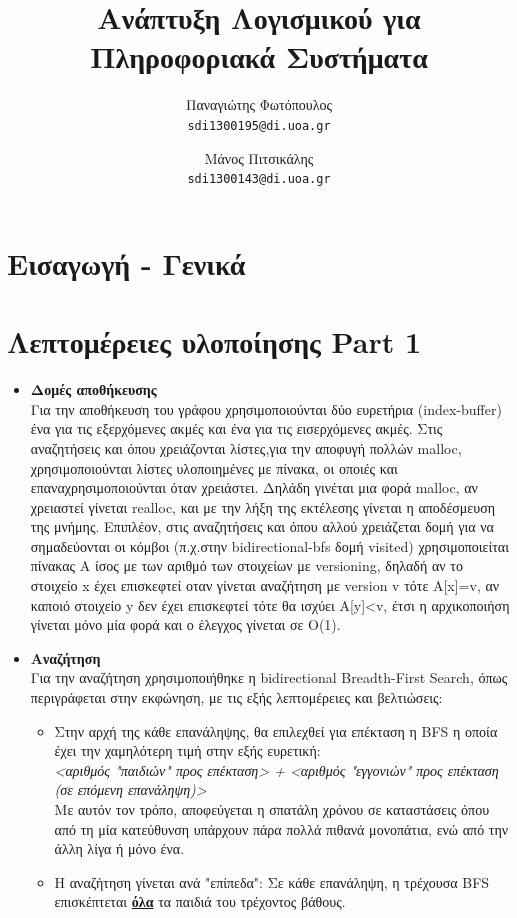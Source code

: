 \documentclass[11pt]{article}
\title{Ανάπτυξη Λογισμικού για Πληροφοριακά Συστήματα}
\author{Παναγιώτης Φωτόπουλος\\
  \texttt{sdi1300195@di.uoa.gr}
  \and Μάνος Πιτσικάλης\\
  \texttt{sdi1300143@di.uoa.gr}}
\date{}
\begin{document}
\maketitle


\section{Εισαγωγή - Γενικά}

\section{Λεπτομέρειες υλοποίησης Part 1}
\begin{itemize}
\item \textbf{Δομές αποθήκευσης}\\ Για την αποθήκευση του γράφου χρησιμοποιούνται δύο ευρετήρια (index-buffer) ένα για τις εξερχόμενες ακμές και ένα για τις εισερχόμενες ακμές. Στις αναζητήσεις και όπου χρειάζονται λίστες,για την αποφυγή πολλών malloc, χρησιμοποιούνται λίστες υλοποιημένες με πίνακα, οι οποιές και επαναχρησιμοποιούνται όταν χρειάστει. Δηλάδη γινέται μια φορά malloc, αν χρειαστεί γίνεται realloc, και με την λήξη της εκτέλεσης γίνεται η αποδέσμευση της μνήμης. Επιπλέον, στις αναζητήσεις και όπου αλλού χρειάζεται δομή για να σημαδεύονται οι κόμβοι (π.χ.στην bidirectional-bfs δομή visited) χρησιμοποιείται πίνακας A ίσος με των αριθμό των στοιχείων με versioning, δηλαδή αν το στοιχείο x έχει επισκεφτεί οταν γίνεται αναζήτηση με version v τότε A[x]=v, αν καποιό στοιχείο y δεν έχει επισκεφτεί τότε θα ισχύει A[y]<v, έτσι η αρχικοποιήση γίνεται μόνο μία φορά και ο έλεγχος γίνεται σε O(1).
\item \textbf{Αναζήτηση}\\ Για την αναζήτηση χρησιμοποιήθηκε η bidirectional Breadth-First Search, όπως περιγράφεται στην εκφώνηση, με τις εξής λεπτομέρειες και βελτιώσεις:
\begin{itemize}
\item Στην αρχή της κάθε επανάληψης, θα επιλεχθεί για επέκταση η BFS η οποία έχει την χαμηλότερη τιμή στην εξής ευρετική:\\
\textit{<αριθμός "παιδιών" προς επέκταση> + <αριθμός "εγγονιών" προς επέκταση (σε επόμενη επανάληψη)>}\\
Με αυτόν τον τρόπο, αποφεύγεται η σπατάλη χρόνου σε καταστάσεις όπου από τη μία κατεύθυνση υπάρχουν πάρα πολλά πιθανά μονοπάτια, ενώ από την άλλη λίγα ή μόνο ένα.
\item Η αναζήτηση γίνεται ανά "επίπεδα": Σε κάθε επανάληψη, η τρέχουσα BFS επισκέπτεται \textbf{\underline{όλα}} τα παιδιά του τρέχοντος βάθους.

\end{itemize}
\end{itemize}
\end{document}
